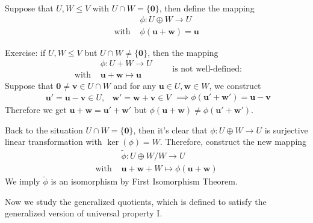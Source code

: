 \begin{example}
Suppose that $U,W\le V$ with $U\cap W = \{\bm0\}$, then define the mapping
\[
\begin{array}{ll}
&\phi:U\oplus W\to U\\
\text{with }&\phi(\bm u+\bm w) = \bm u
\end{array}
\]
\begin{remark}
Exercise: if $U,W\le V$ but $U\cap W\ne\{\bm0\}$, then the mapping
\[
\begin{array}{ll}
&\phi:U+ W\to U\\
\text{with }&\bm u+\bm w \mapsto \bm u
\end{array}\qquad
\text{is not well-defined:}
\]
Suppose that $\bm0\ne\bm v\in U\cap W$ and for any $\bm u\in U,\bm w\in W$, we construct 
\[
\begin{array}{ll}
\bm u'=\bm u-\bm v\in U,
&
\bm w'=\bm w+\bm v\in V
\end{array}\implies
\phi(\bm u'+\bm w')=\bm u-\bm v
\]
Therefore we get $\bm u+\bm w=\bm u'+\bm w'$ but $\phi(\bm u+\bm w)\ne\phi(\bm u'+\bm w')$.
\end{remark}

Back to the situation $U\cap W=\{\bm0\}$, then it's clear that 
$\phi:U\oplus W\to U$ is surjective linear transformation with $\ker(\phi)=W$. 
Therefore, construct the new mapping
\[
\begin{array}{ll}
&\tilde{\phi}:U\oplus W/ W\to U\\
\text{with }&\bm u+\bm w+W\mapsto\phi(\bm u+\bm w)
\end{array}
\]
We imply $\tilde{\phi}$ is an isomorphism by First Isomorphism Theorem.
\end{example}

Now we study the generalized quotients, which is defined to satisfy the generalized version of universal property I.


